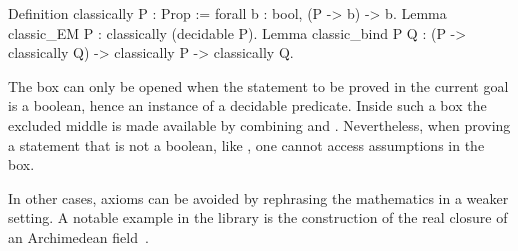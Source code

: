 \begin{coq}{}{}
Definition classically P : Prop := forall b : bool, (P -> b) -> b.
Lemma classic_EM P : classically (decidable P).
Lemma classic_bind P Q :
  (P -> classically Q) -> classically P -> classically Q.
\end{coq}
The  box can only be opened when the statement to be
proved in the current goal is a boolean, hence an instance of a
decidable predicate. Inside such a box the excluded middle is
made available by combining  and .
Nevertheless, when proving a statement that is not a boolean, like
, one cannot access assumptions in the  box.

In other cases, axioms can be avoided by rephrasing the mathematics
in a weaker setting.  A notable example in the \mcbMC{} library
is the construction of the real closure of an Archimedean
field~\cite{DBLP:conf/itp/Cohen12}.
